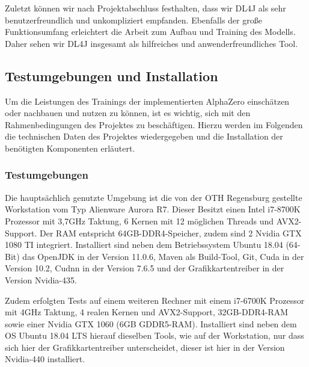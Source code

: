 \documentclass[12pt,a4paper]{article}
\begin{document}
Zuletzt können wir nach Projektabschluss festhalten, dass wir DL4J als sehr benutzerfreundlich und unkompliziert empfanden. Ebenfalls der große Funktionsumfang erleichtert die Arbeit zum Aufbau und Training des Modells. Daher sehen wir DL4J insgesamt als hilfreiches und anwenderfreundliches Tool.

\subsection{Testumgebungen und Installation}
Um die Leistungen des Trainings der implementierten AlphaZero einschätzen oder nachbauen und nutzen zu können, ist es wichtig, sich mit den Rahmenbedingungen des Projektes zu beschäftigen. Hierzu werden im Folgenden die technischen Daten des Projektes wiedergegeben und die Installation der benötigten Komponenten erläutert.

\subsubsection{Testumgebungen}
Die hauptsächlich genutzte Umgebung ist die von der OTH Regensburg gestellte Workstation vom Typ Alienware Aurora R7. Dieser Besitzt einen Intel i7-8700K Prozessor mit 3,7GHz Taktung, 6 Kernen mit 12 möglichen Threads und AVX2-Support. Der RAM entspricht 64GB-DDR4-Speicher, zudem sind 2 Nvidia GTX 1080 TI integriert. Installiert sind neben dem Betriebssystem Ubuntu 18.04 (64-Bit) das OpenJDK in der Version 11.0.6, Maven als Build-Tool, Git, Cuda in der Version 10.2, Cudnn in der Version 7.6.5 und der Grafikkartentreiber in der Version Nvidia-435.

Zudem erfolgten Tests auf einem weiteren Rechner mit einem i7-6700K Prozessor mit 4GHz Taktung, 4 realen Kernen und AVX2-Support, 32GB-DDR4-RAM sowie einer Nvidia GTX 1060 (6GB GDDR5-RAM). Installiert sind neben dem OS Ubuntu 18.04 LTS hierauf dieselben Tools, wie auf der Workstation, nur dass sich hier der Grafikkartentreiber unterscheidet, dieser ist hier in der Version Nvidia-440 installiert. 
\end{document}
